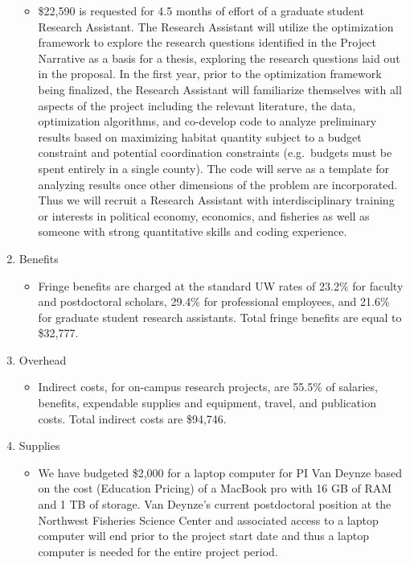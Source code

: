 \begin{enumerate}
\begin{itemize}
\item \$22,590 is requested for 4.5 months of effort of a graduate student Research Assistant. The Research Assistant will utilize the optimization framework to explore the research questions identified in the Project Narrative as a basis for a thesis, exploring the research questions laid out in the proposal. In the first year, prior to the optimization framework being finalized, the Research Assistant will familiarize themselves with all aspects of the project including the relevant literature, the data, optimization algorithms, and co-develop code to analyze preliminary results based on maximizing habitat quantity subject to a budget constraint and potential coordination constraints (e.g.\ budgets must be spent entirely in a single county). The code will serve as a template for analyzing results once other dimensions of the problem are incorporated. Thus we will recruit a Research Assistant with interdisciplinary training or interests in political economy, economics, and fisheries as well as someone with strong quantitative skills and coding experience.
\end{itemize}
\item Benefits
\begin{itemize}
\item Fringe benefits are charged at the standard UW rates of 23.2\% for faculty and postdoctoral scholars, 29.4\% for professional employees, and 21.6\% for graduate student research assistants. Total fringe benefits are equal to \$32,777.
\end{itemize}
\item Overhead
\begin{itemize}
\item Indirect costs, for on-campus research projects, are 55.5\% of salaries, benefits, expendable supplies and equipment, travel, and publication costs. Total indirect costs are \$94,746.
\end{itemize}
\item Supplies
\begin{itemize}
\item We have budgeted \$2,000 for a laptop computer for PI Van Deynze based on the cost (Education Pricing) of a MacBook pro with 16 GB of RAM and 1 TB of storage. Van Deynze's current postdoctoral position at the Northwest Fisheries Science Center and associated access to a laptop computer will end prior to the project start date and thus a laptop computer is needed for the entire project period.
\end{itemize}

\end{enumerate}
